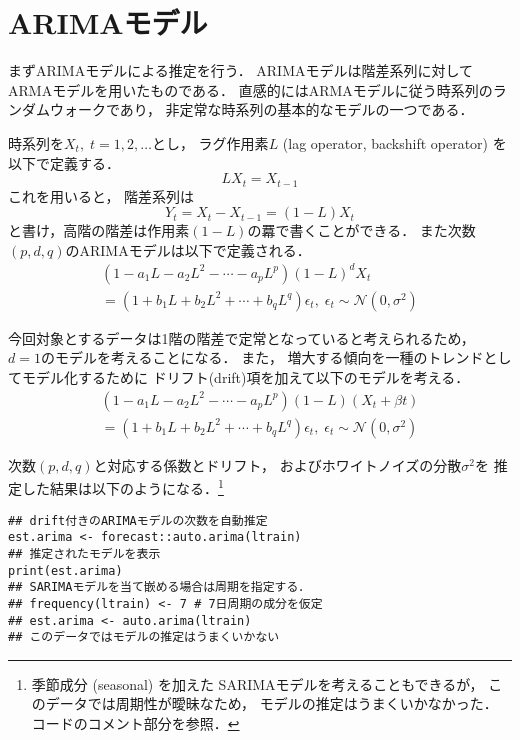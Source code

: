 \documentclass[10pt,oneside,fleqn]{scrartcl}
\begin{document}
\section{ARIMAモデル}
\label{sec:orge9183e6}

まずARIMAモデルによる推定を行う．
ARIMAモデルは階差系列に対してARMAモデルを用いたものである．
直感的にはARMAモデルに従う時系列のランダムウォークであり，
非定常な時系列の基本的なモデルの一つである．

時系列を\(X_{t},\;t=1,2,\dotsc\)とし，
ラグ作用素\(L\) (lag operator, backshift operator) を以下で定義する．
\begin{equation}
  LX_{t}=X_{t-1}
\end{equation}
これを用いると，
階差系列は
\begin{equation}
  Y_{t}=X_{t}-X_{t-1}=(1-L)X_{t}
\end{equation}
と書け，高階の階差は作用素\((1-L)\)の羃で書くことができる．
また次数\((p,d,q)\)のARIMAモデルは以下で定義される．
\begin{equation}
  \begin{multlined}
    (1-a_{1}L-a_{2}L^{2}-\dotsb-a_{p}L^{p})(1-L)^{d}X_{t}\\
    =
    (1+b_{1}L+b_{2}L^{2}+\dotsb+b_{q}L^{q})\epsilon_{t},\;
    \epsilon_{t}\sim\mathcal{N}(0,\sigma^{2})
  \end{multlined}
\end{equation}

今回対象とするデータは1階の階差で定常となっていると考えられるため，
\(d=1\)のモデルを考えることになる．
また，
増大する傾向を一種のトレンドとしてモデル化するために
ドリフト(drift)項を加えて以下のモデルを考える．
\begin{equation}
  \begin{multlined}
    (1-a_{1}L-a_{2}L^{2}-\dotsb-a_{p}L^{p})(1-L)(X_{t}+\beta t)\\
    =
    (1+b_{1}L+b_{2}L^{2}+\dotsb+b_{q}L^{q})\epsilon_{t},\;
    \epsilon_{t}\sim\mathcal{N}(0,\sigma^{2})
  \end{multlined}
\end{equation}

次数\((p,d,q)\)と対応する係数とドリフト，
およびホワイトノイズの分散\(\sigma^{2}\)を
推定した結果は以下のようになる．\footnote{季節成分 (seasonal) を加えた
SARIMAモデルを考えることもできるが，
このデータでは周期性が曖昧なため，
モデルの推定はうまくいかなかった．
コードのコメント部分を参照．}

\begin{verbatim}
## drift付きのARIMAモデルの次数を自動推定
est.arima <- forecast::auto.arima(ltrain)
## 推定されたモデルを表示
print(est.arima)
## SARIMAモデルを当て嵌める場合は周期を指定する．
## frequency(ltrain) <- 7 # 7日周期の成分を仮定
## est.arima <- auto.arima(ltrain)
## このデータではモデルの推定はうまくいかない
\end{verbatim}
\end{document}
